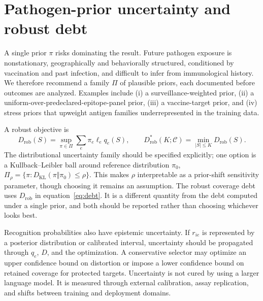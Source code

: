 \documentclass[11pt]{article}
\begin{document}
\section{Pathogen-prior uncertainty and robust debt}
A single prior $\pi$ risks dominating the result. Future pathogen exposure is nonstationary, geographically and behaviorally structured, conditioned by vaccination and past infection, and difficult to infer from immunological history. We therefore recommend a family $\Pi$ of plausible priors, each documented before outcomes are analyzed. Examples include (i) a surveillance-weighted prior, (ii) a uniform-over-predeclared-epitope-panel prior, (iii) a vaccine-target prior, and (iv) stress priors that upweight antigen families underrepresented in the training data.

A robust objective is
\begin{equation}
D_{\mathrm{rob}}(S)=\sup_{\pi\in\Pi}\sum_e\pi_e\ell_e q_e(S),\qquad
D^*_{\mathrm{rob}}(K;\mathcal{C})=\min_{|S|\leq K}D_{\mathrm{rob}}(S).
\label{eq:robust}
\end{equation}
The distributional uncertainty family should be specified explicitly; one option is a Kullback--Leibler ball around reference distribution $\pi_0$, $\Pi_\rho=\{\pi:D_{\mathrm{KL}}(\pi\Vert\pi_0)\leq\rho\}$. This makes $\rho$ interpretable as a prior-shift sensitivity parameter, though choosing it remains an assumption. The robust coverage debt uses $D_{\mathrm{rob}}$ in equation~\eqref{eq:debt}. It is a different quantity from the debt computed under a single prior, and both should be reported rather than choosing whichever looks best.

Recognition probabilities also have epistemic uncertainty. If $r_{ie}$ is represented by a posterior distribution or calibrated interval, uncertainty should be propagated through $q_e$, $D$, and the optimization. A conservative selector may optimize an upper confidence bound on distortion or impose a lower confidence bound on retained coverage for protected targets. Uncertainty is not cured by using a larger language model. It is measured through external calibration, assay replication, and shifts between training and deployment domains.
\end{document}
